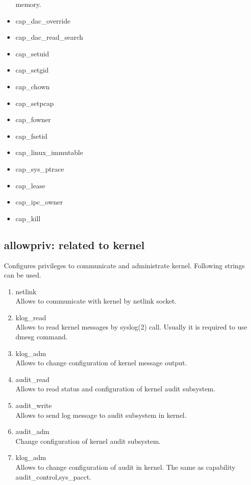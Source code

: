 \documentclass{article}
\begin{document}
\begin{itemize}
       memory.
 \item cap\_dac\_override\\ 
 \item cap\_dac\_read\_search \\
 \item cap\_setuid 
 \item cap\_setgid \\
 \item cap\_chown \\
 \item cap\_setpcap\\
 \item  cap\_fowner\\
 \item  cap\_fsetid \\
 \item cap\_linux\_immutable\\
 \item cap\_sys\_ptrace\\
\item cap\_lease\\
\item cap\_ipc\_owner\\
\item cap\_kill\\

\end{itemize}


\subsection{allowpriv: related to kernel}
Configures privileges to communicate and administrate kernel. 
Following strings can be used.
       \begin{enumerate}
	\item netlink\\
	      Allows to communicate with kernel by netlink socket. 
	\item klog\_read\\
	      Allows to read kernel messages by syslog(2) call. Usually
	      it is required to use dmesg command.
	\item klog\_adm\\
	      Allows to change configuration of kernel message output.
	\item audit\_read\\
	      Allows to read status and configuration of kernel audit
           subsystem.
	\item audit\_write\\
	      Allows to send log message to audit subsystem in
	      kernel.
	\item audit\_adm\\
	      Change configuration of kernel audit subsystem.
	\item klog\_adm\\
	      Allows to change configuration of audit in kernel. The
	      same as capability audit\_control,sys\_pacct.
	      
       
       \end{enumerate}
\end{document}
